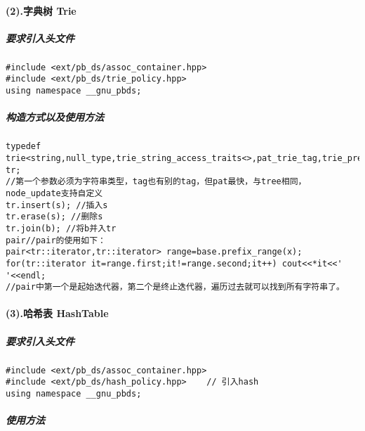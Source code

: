 \documentclass[]{article}
\let\oldparagraph\paragraph
\renewcommand{\paragraph}[1]{\oldparagraph{#1}\mbox{}}
\let\oldsubparagraph\subparagraph
\renewcommand{\subparagraph}[1]{\oldsubparagraph{#1}\mbox{}}
\begin{document}
\hypertarget{ux5b57ux5178ux6811-trie}{%
\paragraph{(2).字典树 Trie}\label{ux5b57ux5178ux6811-trie}}

\hypertarget{ux8981ux6c42ux5f15ux5165ux5934ux6587ux4ef6-1}{%
\subparagraph{要求引入头文件}\label{ux8981ux6c42ux5f15ux5165ux5934ux6587ux4ef6-1}}

\begin{verbatim}
#include <ext/pb_ds/assoc_container.hpp>
#include <ext/pb_ds/trie_policy.hpp>
using namespace __gnu_pbds;
\end{verbatim}

\hypertarget{ux6784ux9020ux65b9ux5f0fux4ee5ux53caux4f7fux7528ux65b9ux6cd5}{%
\subparagraph{构造方式以及使用方法}\label{ux6784ux9020ux65b9ux5f0fux4ee5ux53caux4f7fux7528ux65b9ux6cd5}}

\begin{verbatim}
typedef trie<string,null_type,trie_string_access_traits<>,pat_trie_tag,trie_prefix_search_node_update> tr;
//第一个参数必须为字符串类型，tag也有别的tag，但pat最快，与tree相同，node_update支持自定义
tr.insert(s); //插入s 
tr.erase(s); //删除s 
tr.join(b); //将b并入tr 
pair//pair的使用如下：
pair<tr::iterator,tr::iterator> range=base.prefix_range(x);
for(tr::iterator it=range.first;it!=range.second;it++) cout<<*it<<' '<<endl;
//pair中第一个是起始迭代器，第二个是终止迭代器，遍历过去就可以找到所有字符串了。 
\end{verbatim}

\hypertarget{ux54c8ux5e0cux8868-hashtable}{%
\paragraph{(3).哈希表 HashTable}\label{ux54c8ux5e0cux8868-hashtable}}

\hypertarget{ux8981ux6c42ux5f15ux5165ux5934ux6587ux4ef6-2}{%
\subparagraph{要求引入头文件}\label{ux8981ux6c42ux5f15ux5165ux5934ux6587ux4ef6-2}}

\begin{verbatim}
#include <ext/pb_ds/assoc_container.hpp>
#include <ext/pb_ds/hash_policy.hpp>    // 引入hash
using namespace __gnu_pbds;
\end{verbatim}

\hypertarget{ux4f7fux7528ux65b9ux6cd5}{%
\subparagraph{使用方法}\label{ux4f7fux7528ux65b9ux6cd5}}
\end{document}
